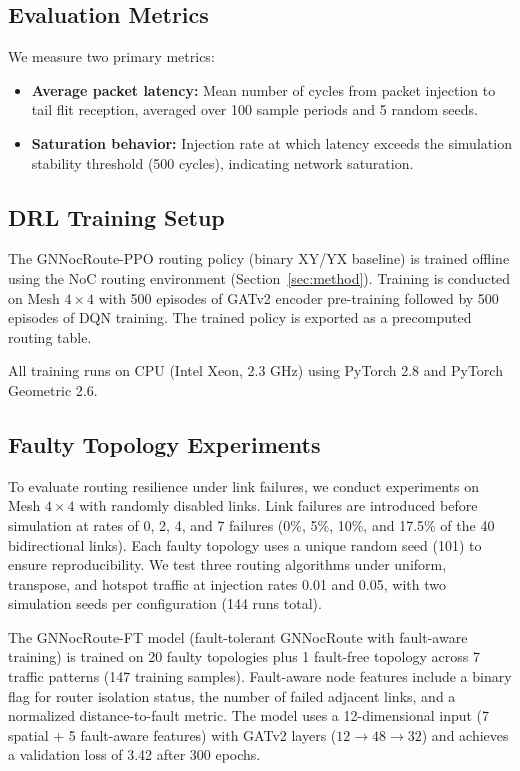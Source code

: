 \subsection{Evaluation Metrics}

We measure two primary metrics:

\begin{itemize}
    \item \textbf{Average packet latency:} Mean number of cycles from packet injection to tail flit reception, averaged over 100 sample periods and 5 random seeds.
    \item \textbf{Saturation behavior:} Injection rate at which latency exceeds the simulation stability threshold (500 cycles), indicating network saturation.
\end{itemize}

\subsection{DRL Training Setup}

The GNNocRoute-PPO routing policy (binary XY/YX baseline) is trained offline using the NoC routing environment (Section~\ref{sec:method}). Training is conducted on Mesh $4\times4$ with 500 episodes of GATv2 encoder pre-training followed by 500 episodes of DQN training. The trained policy is exported as a precomputed routing table.

All training runs on CPU (Intel Xeon, 2.3 GHz) using PyTorch 2.8 and PyTorch Geometric 2.6.

\subsection{Faulty Topology Experiments}
\label{sec:faulty}

To evaluate routing resilience under link failures, we conduct experiments on Mesh $4\times4$ with randomly disabled links. Link failures are introduced before simulation at rates of 0, 2, 4, and 7 failures (0\%, 5\%, 10\%, and 17.5\% of the 40 bidirectional links). Each faulty topology uses a unique random seed (101) to ensure reproducibility. We test three routing algorithms under uniform, transpose, and hotspot traffic at injection rates 0.01 and 0.05, with two simulation seeds per configuration (144 runs total).

The GNNocRoute-FT model (fault-tolerant GNNocRoute with fault-aware training) is trained on 20 faulty topologies plus 1 fault-free topology across 7 traffic patterns (147 training samples). Fault-aware node features include a binary flag for router isolation status, the number of failed adjacent links, and a normalized distance-to-fault metric. The model uses a 12-dimensional input (7 spatial + 5 fault-aware features) with GATv2 layers ($12 \rightarrow 48 \rightarrow 32$) and achieves a validation loss of 3.42 after 300 epochs.


